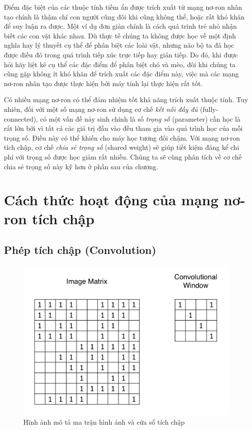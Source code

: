 Điểm đặc biệt của các thuộc tính tiềm ẩn được trích xuất từ mạng nơ-ron nhân tạo chính là thậm chí con người cũng đôi khi cũng không thể, hoặc rất khó khăn để suy luận ra được. Một ví dụ đơn giản chính là cách quá trình trẻ nhỏ nhận biết các con vật khác nhau. Dù thực tế chúng ta không được học về một định nghĩa hay lý thuyết cụ thể để phân biệt các loài vật, nhưng não bộ ta đã học được điều đó trong quá trình tiếp xúc trực tiếp hay gián tiếp. Do đó, khi được hỏi hãy liệt kê cụ thể các đặc điểm để phân biệt chó và mèo, đôi khi chúng ta cũng gặp không ít khó khăn để trích xuất các đặc điểm này, việc mà các mạng nơ-ron nhân tạo được thực hiện bởi máy tính lại thực hiện rất tốt.

Có nhiều mạng nơ-ron có thể đảm nhiệm tốt khả năng trích xuất thuộc tính. Tuy nhiên, đối với một số mạng nơ-ron sử dụng cơ chế \textit{kết nối đầy đủ} (fully-connected), có một vấn đề nảy sinh chính là số \textit{trọng số} (parameter) cần học là rất lớn bởi vì tất cả các giá trị đầu vào đều tham gia vào quá trình học của mỗi trọng số. Điều này có thể khiến cho máy học tương đối chậm. Với mạng nơ-ron tích chập, cơ chế \textit{chia sẻ trọng số} (shared weight) sẽ giúp tiết kiệm đáng kể chi phí với trọng số được học giảm rất nhiều. Chúng ta sẽ cùng phân tích về cơ chế chia sẻ trọng số này kỹ hơn ở phần sau của chương.

\section{Cách thức hoạt động của mạng nơ-ron tích chập}

\subsection{Phép tích chập (Convolution)}
\begin{figure}[!h]
	\centering
		\includegraphics[width=0.8\columnwidth]{books/artificial-neural-network/chapter05/figure/convolution_example_sample.png}
		\centering
	\caption{Hình ảnh mô tả ma trận hình ảnh và cửa sổ tích chập}
	\label{fig:ConvolutionSample}
\end{figure}

